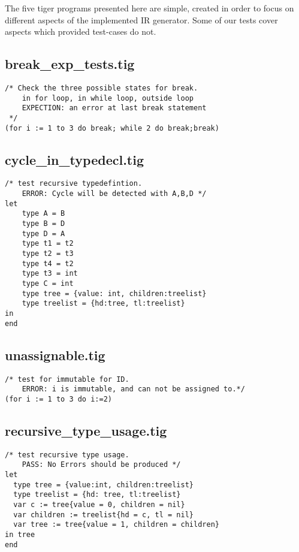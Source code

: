 \documentclass{article}
\begin{document}
The five tiger programs presented here are simple, created in order to focus on different aspects of the implemented IR generator. Some of our tests cover aspects which provided test-cases do not.


\subsection{break\_exp\_tests.tig}

\begin{lstlisting}[frame=single]
/* Check the three possible states for break.
	in for loop, in while loop, outside loop
	EXPECTION: an error at last break statement
 */
(for i := 1 to 3 do break; while 2 do break;break)
\end{lstlisting}

\subsection{cycle\_in\_typedecl.tig}

\begin{lstlisting}[frame=single]
/* test recursive typedefintion.
	ERROR: Cycle will be detected with A,B,D */
let
	type A = B
	type B = D
	type D = A
	type t1 = t2
	type t2 = t3
	type t4 = t2
	type t3 = int
	type C = int
	type tree = {value: int, children:treelist}
	type treelist = {hd:tree, tl:treelist}
in 
end
\end{lstlisting}

\subsection{unassignable.tig}

\begin{lstlisting}[frame=single]
/* test for immutable for ID.
	ERROR: i is immutable, and can not be assigned to.*/
(for i := 1 to 3 do i:=2)
\end{lstlisting}

\subsection{recursive\_type\_usage.tig}

\begin{lstlisting}[frame=single]
 /* test recursive type usage.
	PASS: No Errors should be produced */
let
  type tree = {value:int, children:treelist}
  type treelist = {hd: tree, tl:treelist}
  var c := tree{value = 0, children = nil}
  var children := treelist{hd = c, tl = nil}
  var tree := tree{value = 1, children = children}
in tree
end
\end{lstlisting}
\end{document}
